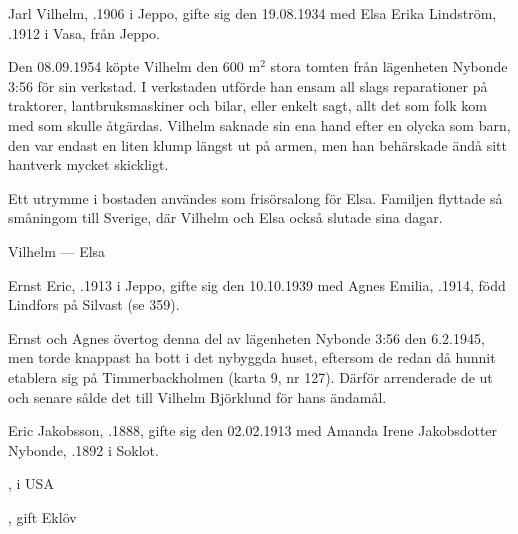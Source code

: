 %
Jarl Vilhelm, .1906 i Jeppo, gifte sig den 19.08.1934 med Elsa Erika Lindström, .1912 i Vasa, från Jeppo.
\begin{jhchildren}
  \item {}
  \item {}
\end{jhchildren}

Den 08.09.1954 köpte Vilhelm den 600 m$^2$ stora tomten från lägenheten Nybonde 3:56 för sin verkstad. I verkstaden utförde han ensam all slags reparationer på traktorer, lantbruksmaskiner och bilar, eller enkelt sagt, allt det som folk kom med som skulle åtgärdas. Vilhelm saknade sin ena hand efter en olycka som barn, den var endast en liten klump längst ut på armen, men han behärskade ändå sitt hantverk mycket skickligt.

Ett utrymme i bostaden användes som frisörsalong för Elsa. Familjen flyttade så småningom till Sverige, där Vilhelm och Elsa också slutade sina dagar.

Vilhelm   ---  Elsa 


%
Ernst Eric, .1913 i Jeppo, gifte sig den 10.10.1939 med Agnes Emilia, .1914, född Lindfors på Silvast (se 359).
\begin{jhchildren}
  \item {}
  \item {}
  \item {}
\end{jhchildren}

Ernst och Agnes övertog denna del av lägenheten Nybonde 3:56 den 6.2.1945, men torde knappast ha bott i det nybyggda huset, eftersom de redan då hunnit etablera sig på Timmerbackholmen (karta 9, nr 127). Därför arrenderade de ut och senare sålde det till Vilhelm Björklund för hans ändamål.


%
Eric Jakobsson, .1888, gifte sig den 02.02.1913 med Amanda Irene Jakobsdotter Nybonde, .1892 i Soklot.
\begin{jhchildren}
  \item {}, i USA
  \item {}
  \item {}, gift Eklöv
\end{jhchildren}

